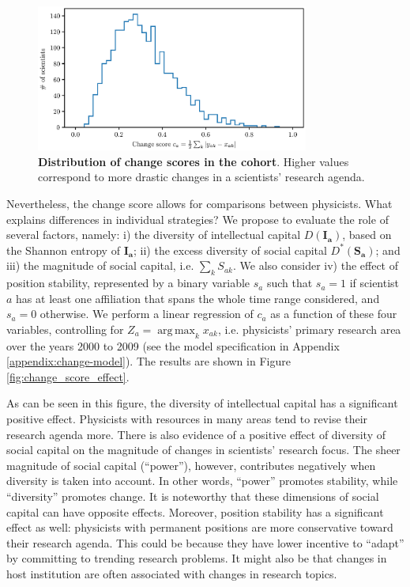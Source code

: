 \documentclass{article}
\DeclareMathOperator*{\argmax}{arg\,max}
\begin{document}
\begin{figure}[h]
    \centering
        \includegraphics[width=0.8\textwidth]{plots/change_score.eps}
    \caption{\textbf{Distribution of change scores in the cohort}. Higher values correspond to more drastic changes in a scientists' research agenda.}    
    \label{fig:change_scores}
\end{figure}

Nevertheless, the change score allows for comparisons between physicists. What explains differences in individual strategies? We propose to evaluate the role of several factors, namely: i) the diversity of intellectual capital $D(\bm{I_a})$, based on the Shannon entropy of $\bm{I_a}$; ii) the excess diversity of social capital $D^{\ast}(\bm{S_a})$; and iii) the magnitude of social capital, i.e. $\sum_k S_{ak}$. We also consider iv) the effect of position stability, represented by a binary variable $s_a$ such that $s_a=1$ if scientist $a$ has at least one affiliation that spans the whole time range considered, and $s_a=0$ otherwise. We perform a linear regression of $c_a$ as a function of these four variables, controlling for $Z_a=\argmax_{k} x_{ak}$, i.e. physicists' primary research area over the years 2000 to 2009 (see the model specification in Appendix \ref{appendix:change-model}). The results are shown in Figure \ref{fig:change_score_effect}.

As can be seen in this figure, the diversity of intellectual capital has a significant positive effect. Physicists with resources in many areas tend to revise their research agenda more. There is also evidence of a positive effect of diversity of social capital on the magnitude of changes in scientists' research focus. The sheer magnitude of social capital (``power''), however, contributes negatively when diversity is taken into account. In other words, ``power'' promotes stability, while ``diversity'' promotes change. It is noteworthy that these dimensions of social capital can have opposite effects. Moreover, position stability has a significant effect as well: physicists with permanent positions are more conservative toward their research agenda. This could be because they have lower incentive to ``adapt'' by committing to trending research problems. It might also be that changes in host institution are often associated with changes in research topics.
\end{document}
